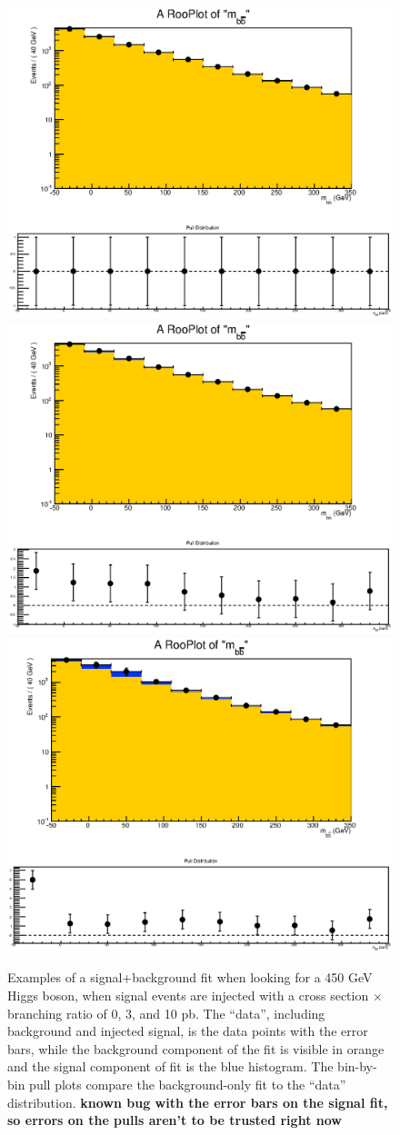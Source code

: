 \begin{figure}[hbt]
    \center
    \includegraphics[width=0.3\linewidth]{FitResults/images/fitData_bAbb_450_log_3jets_bbb_hipt_0sig.eps}
    \includegraphics[width=0.3\linewidth]{FitResults/images/fitData_bAbb_450_log_3jets_bbb_hipt_3sig.eps}
    \includegraphics[width=0.3\linewidth]{FitResults/images/fitData_bAbb_450_log_3jets_bbb_hipt_10sig.eps}
    \caption{Examples of a signal+background fit when looking for a 450 GeV Higgs boson,
    when signal events are injected with a cross section $\times$ branching ratio of 0, 3, and 10 pb.
    The ``data'', including background and injected signal, is the data points with the error bars,
    while the background component of the fit is visible in orange and the signal component of fit
    is the blue histogram.  The bin-by-bin pull plots compare the background-only fit to the ``data''
    distribution. \textbf{known bug with the error bars on the signal fit, so errors on the pulls aren't
    to be trusted right now}
    \label{fig:signal_injection_450}}
\end{figure}

